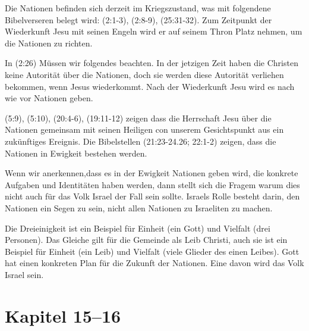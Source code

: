 \documentclass{../../inc/mybib}
\begin{document}
Die Nationen befinden sich derzeit im Kriegszustand, was mit folgendene Bibelverseren belegt wird: (2:1-3), (2:8-9), (25:31-32). Zum Zeitpunkt der Wiederkunft Jesu mit seinen Engeln wird er auf seinem Thron Platz nehmen, um die Nationen zu richten.

In (2:26) Müssen wir folgendes beachten. In der jetzigen Zeit haben die Christen keine Autorität über die Nationen, doch sie werden diese Autorität verliehen bekommen, wenn Jesus wiederkommt. Nach der Wiederkunft Jesu wird es nach wie vor Nationen geben.

(5:9), (5:10), (20:4-6), (19:11-12) zeigen dass die Herrschaft Jesu über die Nationen gemeinsam mit seinen Heiligen con unserem Gesichtspunkt aus ein zukünftiges Ereignis.
Die Bibelstellen (21:23-24.26; 22:1-2) zeigen, dass die Nationen in Ewigkeit bestehen werden.

Wenn wir anerkennen,dass es in der Ewigkeit Nationen geben wird, die konkrete Aufgaben und Identitäten haben werden, dann stellt sich die Fragem warum dies nicht auch für das Volk Israel der Fall sein sollte. Israels Rolle besteht darin, den Nationen ein Segen zu sein, nicht allen Nationen zu Israeliten zu machen.

Die Dreieinigkeit ist ein Beispiel für Einheit (ein Gott) und Vielfalt (drei Personen). Das Gleiche gilt für die Gemeinde als Leib Christi, auch sie ist ein Beispiel für Einheit (ein Leib) und Vielfalt (viele Glieder des einen Leibes). Gott hat einen konkreten Plan für die Zukunft der Nationen. Eine davon wird das Volk Israel sein.

\section{Kapitel 15--16}
\end{document}
